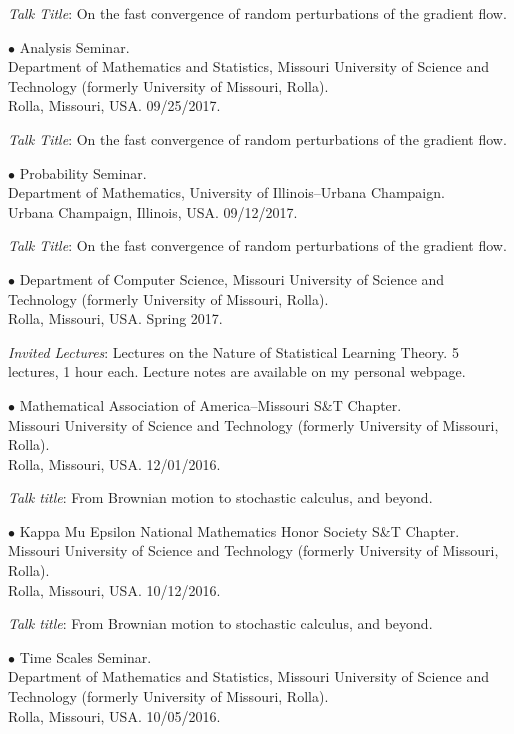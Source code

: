 \documentclass[margin,line]{res}
\begin{document}
\begin{resume}
\textit{Talk Title}: On the fast convergence of random perturbations of the gradient flow.


{$\bullet$ Analysis Seminar. \\ Department of Mathematics and Statistics,
Missouri University of Science and Technology (formerly University of Missouri, Rolla). \\
Rolla, Missouri, USA.} \hfill 09/25/2017.

\textit{Talk Title}: On the fast convergence of random perturbations of the gradient flow.


{$\bullet$ Probability Seminar. \\
Department of Mathematics, University of Illinois--Urbana Champaign. \\
Urbana Champaign, Illinois, USA.} \hfill 09/12/2017.

\textit{Talk Title}: On the fast convergence of random perturbations of the gradient flow.


{$\bullet$ Department of Computer Science,
Missouri University of Science and Technology (formerly University of Missouri, Rolla). \\
Rolla, Missouri, USA.} \hfill Spring 2017.

\textit{Invited Lectures}: Lectures on the Nature of Statistical Learning Theory. 5 lectures, 1 hour each.
Lecture notes are available on my personal webpage.


{$\bullet$ Mathematical Association of America--Missouri S\&T Chapter. \\
Missouri University of Science and Technology (formerly University of Missouri, Rolla). \\
Rolla, Missouri, USA.} \hfill 12/01/2016.

\textit{Talk title}: From Brownian motion to stochastic calculus, and beyond.


{$\bullet$ Kappa Mu Epsilon National Mathematics Honor Society S\&T Chapter. \\
Missouri University of Science and Technology (formerly University of Missouri, Rolla). \\
Rolla, Missouri, USA.} \hfill 10/12/2016.

\textit{Talk title}: From Brownian motion to stochastic calculus, and beyond.


{$\bullet$ Time Scales Seminar. \\
Department of Mathematics and Statistics,
Missouri University of Science and Technology (formerly University of Missouri, Rolla). \\
Rolla, Missouri, USA.} \hfill 10/05/2016.


\end{resume}
\end{document}
